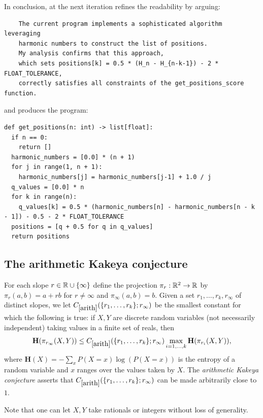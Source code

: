 In conclusion, at the next iteration \AlphaEvolve refines the readability by arguing: 
{\small
\begin{verbatim}
    The current program implements a sophisticated algorithm leveraging 
    harmonic numbers to construct the list of positions.
    My analysis confirms that this approach, 
    which sets positions[k] = 0.5 * (H_n - H_{n-k-1}) - 2 * FLOAT_TOLERANCE,
    correctly satisfies all constraints of the get_positions_score function.
\end{verbatim}
}
and produces the program:
{\small
\begin{verbatim}
def get_positions(n: int) -> list[float]:
  if n == 0:
    return []
  harmonic_numbers = [0.0] * (n + 1)
  for j in range(1, n + 1):
    harmonic_numbers[j] = harmonic_numbers[j-1] + 1.0 / j
  q_values = [0.0] * n
  for k in range(n):
    q_values[k] = 0.5 * (harmonic_numbers[n] - harmonic_numbers[n - k - 1]) - 0.5 - 2 * FLOAT_TOLERANCE
  positions = [q + 0.5 for q in q_values]
  return positions
\end{verbatim}
}

\subsection{The arithmetic Kakeya conjecture}

\renewcommand{\problemURL}{https://google-deepmind.github.io/alphaevolve_repository_of_problems/problems/30.html}

\begin{problem}\label{arith} For each slope $r \in \mathbb{R} \cup \{\infty\}$ define the projection $\pi_r : \mathbb{R}^2 \to \mathbb{R}$ by $\pi_r(a,b) = a + rb$ for $r \neq \infty$ and $\pi_\infty(a,b)=b$.  Given a set $r_1,\dots,r_k, r_\infty$ of distinct slopes, we let $C_{\ref{arith}}(\{r_1,\dots,r_k\}; r_\infty)$ be the smallest constant for which the following is true: if $X,Y$ are discrete random variables (not necessarily independent) taking values in a finite set of reals, then
$$ {\mathbf H}(\pi_{r_\infty}(X,Y)) \leq C_{\ref{arith}}(\{r_1,\dots,r_k\}; r_\infty) \max_{i=1,\dots,k} {\mathbf H}(\pi_{r_i}(X,Y)),$$
where ${\mathbf H}(X) = -\sum_{x} P(X = x) \log(P(X=x))$ is the entropy of a random variable and $x$ ranges over the values taken by $X$. The \emph{arithmetic Kakeya conjecture} asserts that $C_{\ref{arith}}(\{r_1,\dots,r_k\}; r_\infty)$ can be made arbitrarily close to $1$.
\end{problem}

Note that one can let $X,Y$ take rationals or integers without loss of generality.



